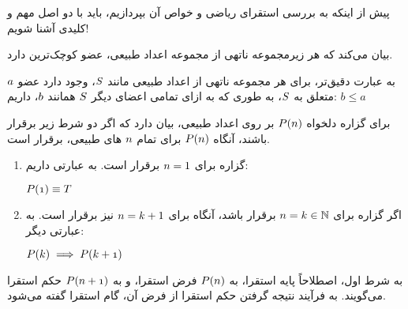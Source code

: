     پیش از اینکه به بررسی استقرای ریاضی و خواص آن بپردازیم، باید با دو اصل مهم و کلیدی آشنا شویم!
    \begin{DEFINITION}
        بیان می‌کند که هر زیرمجموعه ناتهی از مجموعه اعداد طبیعی، عضو کوچک‌ترین دارد.
        
        به عبارت دقیق‌تر،
        برای هر مجموعه ناتهی از اعداد طبیعی مانند
        $\mathnormal{S}$،
         وجود دارد عضو
        $\mathnormal{a}$
        متعلق به 
        $\mathnormal{S}$،
        به طوری که به ازای تمامی اعضای دیگر
        $\mathnormal{S}$
        همانند
        $\mathnormal{b}$،
        داریم:
        $b \leq a$

    \end{DEFINITION}

    \begin{DEFINITION}
        برای گزاره دلخواه
        $\mathnormal{P(n)}$
        بر روی اعداد طبیعی،
        بیان دارد که اگر دو شرط زیر برقرار باشند، آنگاه
        $\mathnormal{P(n)}$
        برای تمام 
        $\mathnormal{n}$
        های طبیعی، برقرار است.
        
        \begin{enumerate}
            \item گزاره برای 
                    $\mathnormal{n} = 1$
                     برقرار است. به عبارتی داریم:
                    \begin{flushleft}
                        $\mathnormal{P(1)} \equiv T$
                    \end{flushleft}
                    
            \item اگر گزاره برای
                    $\mathnormal{n} = k \in \mathbb{N}$
                    برقرار باشد، آنگاه برای
                    $\mathnormal{n} = k + 1$
                    نیز برقرار است. به عبارتی دیگر:
                    \begin{flushleft} 
                        $\mathnormal{P(k)} \implies \mathnormal{P(k + 1)}$
                    \end{flushleft}

        \end{enumerate} 

        به شرط اول، اصطلاحاً پایه استقرا، به 
        $\mathnormal{P(n)}$
        فرض استقرا،
        و به
        $\mathnormal{P(n + 1)}$
        حکم استقرا می‌گویند.
        به فرآیند نتیجه گرفتن حکم استقرا از فرض آن، گام استقرا گفته می‌شود.

    \end{DEFINITION}


